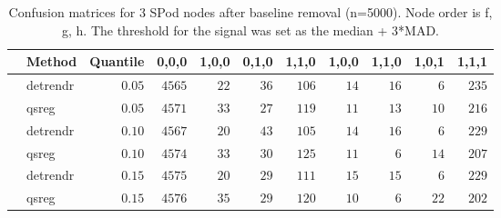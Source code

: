 \begin{table}[!tbp]
\caption{Confusion matrices for 3 SPod nodes after baseline 
      removal (n=5000). Node order is f, g, h. The threshold for the signal was 
      set as the median + 3*MAD.\label{confusion}} 
\begin{center}
\begin{tabular}{llrrrrrrrrr}
\hline\hline
\multicolumn{1}{l}{}&\multicolumn{1}{c}{Method}&\multicolumn{1}{c}{Quantile}&\multicolumn{1}{c}{0,0,0}&\multicolumn{1}{c}{1,0,0}&\multicolumn{1}{c}{0,1,0}&\multicolumn{1}{c}{1,1,0}&\multicolumn{1}{c}{1,0,0}&\multicolumn{1}{c}{1,1,0}&\multicolumn{1}{c}{1,0,1}&\multicolumn{1}{c}{1,1,1}\tabularnewline
\hline
&detrendr&$0.05$&$4565$&$22$&$36$&$106$&$14$&$16$&$ 6$&$235$\tabularnewline
&qsreg&$0.05$&$4571$&$33$&$27$&$119$&$11$&$13$&$10$&$216$\tabularnewline
&detrendr&$0.10$&$4567$&$20$&$43$&$105$&$14$&$16$&$ 6$&$229$\tabularnewline
&qsreg&$0.10$&$4574$&$33$&$30$&$125$&$11$&$ 6$&$14$&$207$\tabularnewline
&detrendr&$0.15$&$4575$&$20$&$29$&$111$&$15$&$15$&$ 6$&$229$\tabularnewline
&qsreg&$0.15$&$4576$&$35$&$29$&$120$&$10$&$ 6$&$22$&$202$\tabularnewline
\hline
\end{tabular}\end{center}
\end{table}
